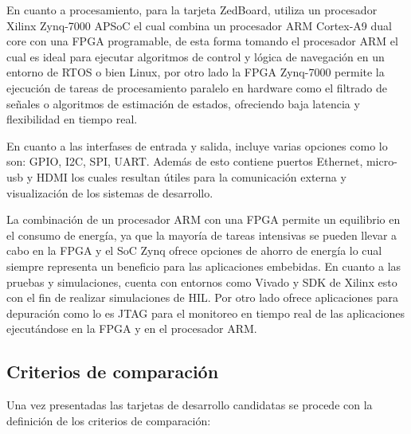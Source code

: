En cuanto a procesamiento, para la tarjeta ZedBoard, utiliza un procesador Xilinx Zynq-7000 APSoC el cual combina un procesador ARM Cortex-A9 dual core con una FPGA programable, de esta forma tomando el procesador ARM el cual es ideal para ejecutar algoritmos de control y  lógica de navegación en un entorno de RTOS o bien Linux, por otro lado la FPGA Zynq-7000 permite la ejecución de tareas de procesamiento paralelo en hardware como el filtrado de señales o algoritmos de estimación de estados, ofreciendo baja latencia y flexibilidad en tiempo real.

En cuanto a las interfases de entrada y salida, incluye varias opciones como lo son: GPIO, I2C, SPI, UART. Además de esto contiene puertos Ethernet, micro-usb y HDMI los cuales resultan útiles para la comunicación externa y visualización de los sistemas de desarrollo.

La combinación de un procesador ARM con una FPGA permite un equilibrio en el consumo de energía, ya que la mayoría de tareas intensivas se pueden llevar a cabo en la FPGA y el SoC Zynq ofrece opciones de ahorro de energía lo cual siempre representa un beneficio para las aplicaciones embebidas. En cuanto a las pruebas y simulaciones, cuenta con entornos como Vivado y SDK de Xilinx esto con el fin de realizar simulaciones de HIL. Por otro lado ofrece aplicaciones para depuración como lo es JTAG para el monitoreo en tiempo real de las aplicaciones ejecutándose en la FPGA y en el procesador ARM.
\subsection{Criterios de comparación}

Una vez presentadas las tarjetas de desarrollo candidatas se procede con la definición de los criterios de comparación:

